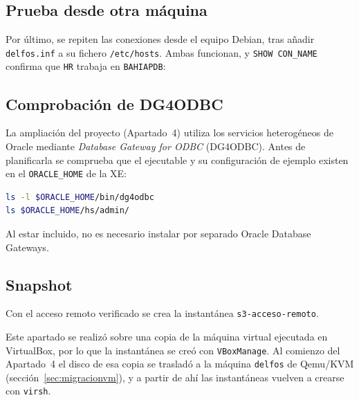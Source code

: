 \subsection{Prueba desde otra máquina}

Por último, se repiten las conexiones desde el equipo Debian, tras añadir \texttt{delfos.inf} a su fichero \texttt{/etc/hosts}. Ambas funcionan, y \texttt{SHOW CON\_NAME} confirma que \texttt{HR} trabaja en \texttt{BAHIAPDB}:


\subsection{Comprobación de DG4ODBC}

La ampliación del proyecto (Apartado~4) utiliza los servicios heterogéneos de Oracle mediante \textit{Database Gateway for ODBC} (DG4ODBC). Antes de planificarla se comprueba que el ejecutable y su configuración de ejemplo existen en el \texttt{ORACLE\_HOME} de la XE:

\begin{lstlisting}[language=bash]
ls -l $ORACLE_HOME/bin/dg4odbc
ls $ORACLE_HOME/hs/admin/
\end{lstlisting}


Al estar incluido, no es necesario instalar por separado Oracle Database Gateways.

\subsection{Snapshot}

Con el acceso remoto verificado se crea la instantánea \texttt{s3-acceso-remoto}.

Este apartado se realizó sobre una copia de la máquina virtual ejecutada en VirtualBox, por lo que la instantánea se creó con \texttt{VBoxManage}. Al comienzo del Apartado~4 el disco de esa copia se trasladó a la máquina \texttt{delfos} de Qemu/KVM (sección~\ref{sec:migracionvm}), y a partir de ahí las instantáneas vuelven a crearse con \texttt{virsh}.

